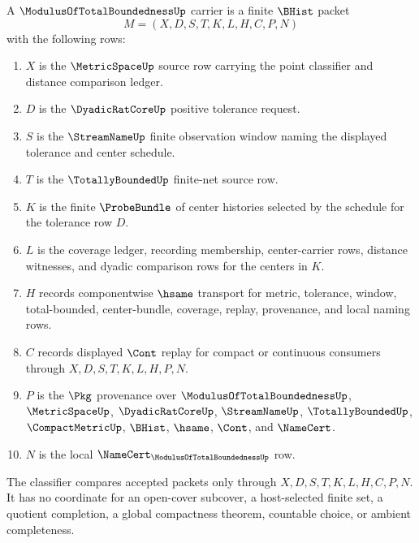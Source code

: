 \begin{definition}
\label{def:modulus-of-total-boundedness-carrier}
A $\ModulusOfTotalBoundednessUp$ carrier is a finite $\BHist$ packet
$$
M=(X,D,S,T,K,L,H,C,P,N)
$$
with the following rows:
\begin{enumerate}
\item $X$ is the $\MetricSpaceUp$ source row carrying the point classifier and distance comparison ledger.
\item $D$ is the $\DyadicRatCoreUp$ positive tolerance request.
\item $S$ is the $\StreamNameUp$ finite observation window naming the displayed tolerance and center schedule.
\item $T$ is the $\TotallyBoundedUp$ finite-net source row.
\item $K$ is the finite $\ProbeBundle$ of center histories selected by the schedule for the tolerance row $D$.
\item $L$ is the coverage ledger, recording membership, center-carrier rows, distance witnesses, and dyadic comparison rows for the centers in $K$.
\item $H$ records componentwise $\hsame$ transport for metric, tolerance, window, total-bounded, center-bundle, coverage, replay, provenance, and local naming rows.
\item $C$ records displayed $\Cont$ replay for compact or continuous consumers through $X,D,S,T,K,L,H,P,N$.
\item $P$ is the $\Pkg$ provenance over $\ModulusOfTotalBoundednessUp$, $\MetricSpaceUp$, $\DyadicRatCoreUp$, $\StreamNameUp$, $\TotallyBoundedUp$, $\CompactMetricUp$, $\BHist$, $\hsame$, $\Cont$, and $\NameCert$.
\item $N$ is the local $\NameCert_{\ModulusOfTotalBoundednessUp}$ row.
\end{enumerate}
The classifier compares accepted packets only through $X,D,S,T,K,L,H,C,P,N$. It has no coordinate for an open-cover subcover, a host-selected finite set, a quotient completion, a global compactness theorem, countable choice, or ambient completeness.
\end{definition}

